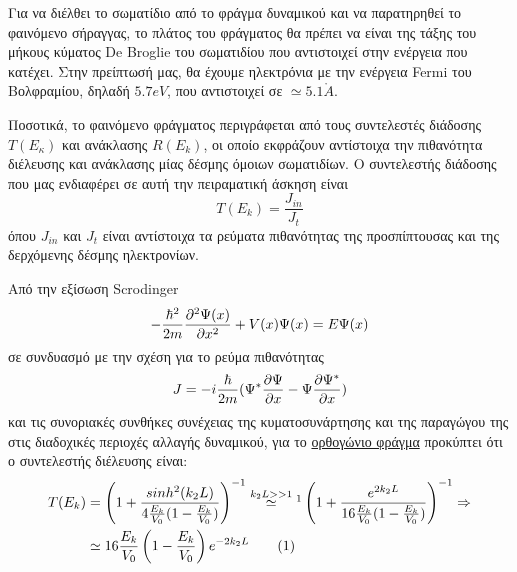\documentclass[a4paper]{article}
\newcommand\numberthis{\addtocounter{equation}{1}\tag{\theequation}}
\begin{document}
Για να διέλθει το σωματίδιο από το φράγμα δυναμικού και να παρατηρηθεί το φαινόμενο σήραγγας, το πλάτος του φράγματος θα πρέπει να είναι της τάξης του μήκους κύματος De Broglie του σωματιδίου που αντιστοιχεί στην ενέργεια που κατέχει. Στην	πρείπτωσή μας, θα έχουμε ηλεκτρόνια με την ενέργεια Fermi του Βολφραμίου, δηλαδή $5.7eV$, που αντιστοιχεί σε $\simeq 5.1 \mathring{A}$.

Ποσοτικά, το φαινόμενο φράγματος περιγράφεται από τους συντελεστές διάδοσης $Τ(Ε_κ)$ και ανάκλασης $R(E_k)$\footnotemark, οι οποίο εκφράζουν αντίστοιχα την πιθανότητα διέλευσης και ανάκλασης μίας δέσμης όμοιων σωματιδίων.%
Ο συντελεστής διάδοσης που μας ενδιαφέρει σε αυτή την πειραματική άσκηση είναι 
\begin{equation}
T(E_k) = \frac{J_{in}}{J_{t}}
\end{equation}
όπου $J_{in}$ και $J_{t}$ είναι αντίστοιχα τα ρεύματα πιθανότητας της προσπίπτουσας και της δερχόμενης δέσμης ηλεκτρονίων. 

Από την εξίσωση Scrodinger
\begin{equation}
-\frac{\hbar ^2}{2m}\pdv[2]{\Psi(x)}{x} + V(x) \Psi(x) = E \Psi(x)
\end{equation}
σε συνδυασμό με την σχέση για το ρεύμα πιθανότητας 
\begin{equation}
J = -i\frac{\hbar}{2m}(\Psi^*\pdv{\Psi}{x} - \Psi\pdv{\Psi^*}{x})
\end{equation}
και τις συνοριακές συνθήκες συνέχειας της κυματοσυνάρτησης και της παραγώγου της στις διαδοχικές περιοχές αλλαγής δυναμικού, για το \underline{ορθογώνιο φράγμα} προκύπτει ότι ο συντελεστής διέλευσης είναι: 
\begin{align*}
T(E_k) &= \left( 1 + \frac{sinh^2(k_2 L)}{4\frac{E_k}{V_0}(1-\frac{E_k}{V_0})} \right)^{-1} \stackrel{k_2L>>1}{\simeq} \footnotemark  
\left( 1 + \frac{e^{2k_2 L}}{16\frac{E_k}{V_0}(1-\frac{E_k}{V_0})} \right)^{-1} \Rightarrow \\ 
&\simeq 16\frac{E_k}{V_0}\left(1-\frac{E_k}{V_0}\right)e^{-2k_2 L}  \numberthis %
\end{align*}
\end{document}
